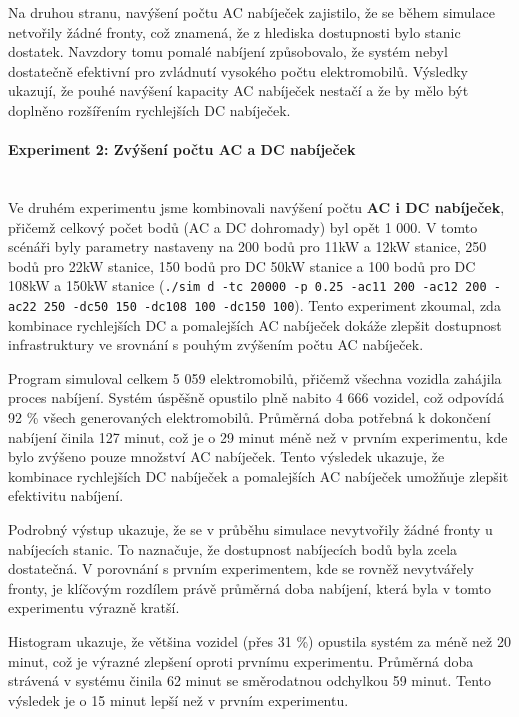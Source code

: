 \documentclass[a4paper,11pt]{article}
\begin{document}
Na druhou stranu, navýšení počtu AC nabíječek zajistilo, že se během simulace netvořily žádné fronty, což znamená, že z hlediska dostupnosti bylo stanic dostatek. Navzdory tomu pomalé nabíjení způsobovalo, že systém nebyl dostatečně efektivní pro zvládnutí vysokého počtu elektromobilů. Výsledky ukazují, že pouhé navýšení kapacity AC nabíječek nestačí a že by mělo být doplněno rozšířením rychlejších DC nabíječek.


\paragraph{Experiment 2: Zvýšení počtu AC a DC nabíječek\\\\}
Ve druhém experimentu jsme kombinovali navýšení počtu \textbf{AC i DC nabíječek}, přičemž celkový počet bodů (AC a DC dohromady) byl opět 1 000. V tomto scénáři byly parametry nastaveny na 200 bodů pro 11kW a 12kW stanice, 250 bodů pro 22kW stanice, 150 bodů pro DC 50kW stanice a 100 bodů pro DC 108kW a 150kW stanice (\texttt{./sim d -tc 20000 -p 0.25 -ac11 200 -ac12 200 -ac22 250 -dc50 150 -dc108 100 -dc150 100}). Tento experiment zkoumal, zda kombinace rychlejších DC a pomalejších AC nabíječek dokáže zlepšit dostupnost infrastruktury ve srovnání s pouhým zvýšením počtu AC nabíječek.

Program simuloval celkem 5 059 elektromobilů, přičemž všechna vozidla zahájila proces nabíjení. Systém úspěšně opustilo plně nabito 4 666 vozidel, což odpovídá 92 \% všech generovaných elektromobilů. Průměrná doba potřebná k dokončení nabíjení činila 127 minut, což je o 29 minut méně než v prvním experimentu, kde bylo zvýšeno pouze množství AC nabíječek. Tento výsledek ukazuje, že kombinace rychlejších DC nabíječek a pomalejších AC nabíječek umožňuje zlepšit efektivitu nabíjení.

Podrobný výstup ukazuje, že se v průběhu simulace nevytvořily žádné fronty u nabíjecích stanic. To naznačuje, že dostupnost nabíjecích bodů byla zcela dostatečná. V porovnání s prvním experimentem, kde se rovněž nevytvářely fronty, je klíčovým rozdílem právě průměrná doba nabíjení, která byla v tomto experimentu výrazně kratší.

Histogram ukazuje, že většina vozidel (přes 31 \%) opustila systém za méně než 20 minut, což je výrazné zlepšení oproti prvnímu experimentu. Průměrná doba strávená v systému činila 62 minut se směrodatnou odchylkou 59 minut. Tento výsledek je o 15 minut lepší než v prvním experimentu.
\end{document}
